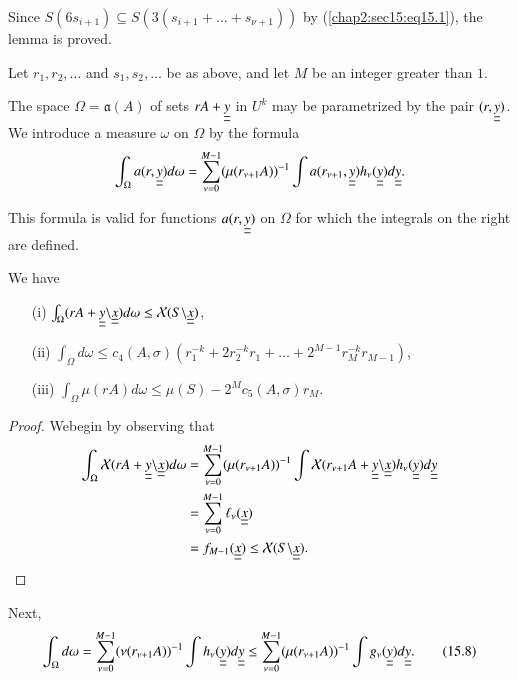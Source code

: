 Since $S(6s_{i+1}) \subseteq S(3(s_{i+1} + \ldots + s_{\nu+1}))$ by (\ref{chap2:sec15:eq15.1}), the lemma is proved.

Let $r_{1}, r_{2}, \ldots$ and $s_{1}, s_{2}, \ldots$ be as above, and let $M$ be an integer greater than $1$.

The space $\Omega = \mathfrak{a}(A)$ of sets $rA + \underline{\underline{y}}$ in $U^{k}$ may be parametrized by the pair $(r, \underline{\underline{y}})$. We introduce a measure $\omega$ on $\Omega$ by the formula
$$
\int_{\Omega} a(r, \underline{\underline{y}}) d\omega = \sum_{\nu=0}^{M-1} (\mu(r_{\nu+1} A))^{-1} \int a(r_{\nu+1}, \underline{\underline{y}}) h_{\nu} (\underline{\underline{y}}) d\underline{\underline{y}}.
$$

This formula is valid for functions $a(r, \underline{\underline{y}})$ on $\Omega$ for which the integrals on the right are defined.

\begin{lemma}\label{chap2:sec15:lem15C}
We have
\begin{enumerate}
\item[\rm(i)] $\int_{\Omega} (rA + \underline{\underline{y}} \backslash \underline{\underline{x}}) d\omega \leq \mathcal{X} (S \backslash \underline{\underline{x}})$,
\item[\rm(ii)] $\int_{\Omega} d\omega \leq c_{4} (A, \sigma)(r_{1}^{-k} + 2r_{2}^{-k} r_{1} + \ldots + 2^{M-1} r_{M}^{-k} r_{M-1})$, 
\item[\rm(iii)] $\int_{\Omega} \mu(rA) d\omega \leq \mu(S) - 2^{M} c_{5} (A, \sigma) r_{M}$.
\end{enumerate}
\end{lemma}

\begin{proof}
We\pageoriginale begin by observing that
\begin{align*}
\int_{\Omega} \mathcal{X} (rA + \underline{\underline{y}} \backslash \underline{\underline{x}}) d\omega & = \sum_{\nu=0}^{M-1} (\mu(r_{\nu+1} A))^{-1} \int \mathcal{X} (r_{\nu+1} A + \underline{\underline{y}} \backslash \underline{\underline{x}}) h_{\nu} (\underline{\underline{y}}) d\underline{\underline{y}}\\
& = \sum_{\nu=0}^{M-1} \ell_{\nu} (\underline{\underline{x}})\\
& = f_{M - 1} (\underline{\underline{x}}) \leq \mathcal{X} (S \backslash \underline{\underline{x}}).
\end{align*}
\end{proof}

Next,
\begin{equation*}
\int_{\Omega} d\omega = \sum_{\nu=0}^{M-1} (\nu(r_{\nu+1} A))^{-1} \int h_{\nu} (\underline{\underline{y}}) d\underline{\underline{y}} \leq \sum_{\nu=0}^{M-1} (\mu(r_{\nu+1} A))^{-1} \int g_{\nu} (\underline{\underline{y}}) d\underline{\underline{y}}.\tag{15.8}\label{chap2:sec15:eq15.8}
\end{equation*}

